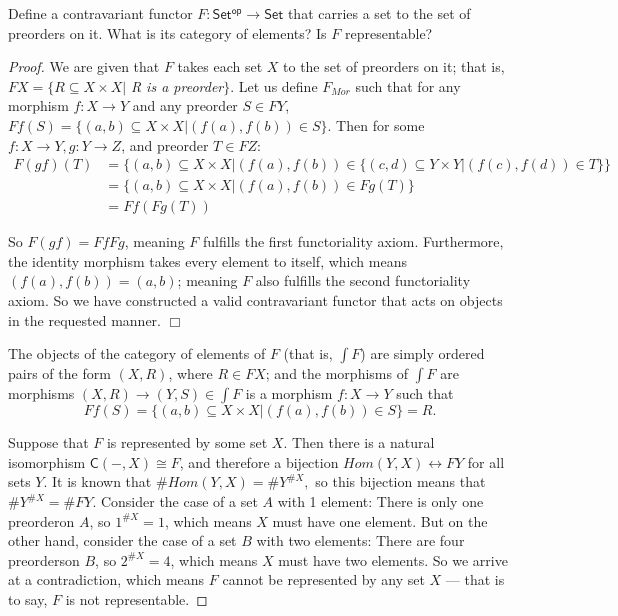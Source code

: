 \documentclass[main.tex]{subfiles}
\begin{document}
\begin{exercise}
	Define a contravariant functor $ F \colon \mathsf{Set^{op}} \to \mathsf{Set} $
	that carries a set to the set of preorders on it. What is its category of
	elements? Is $ F $ representable?	
\end{exercise}

\begin{proof} We are given that $ F $ takes each set $ X $ to the set of preorders on it; that is, $FX = \{R \subseteq X \times X | $ \textit{R is a preorder}$ \} $. Let us define $ F_{Mor} $ such that for any morphism $ f: X \to Y $ and any preorder $ S \in FY $, $ Ff(S) = \{(a,b) \subseteq X \times X | (f(a), f(b)) \in S\} $. Then for some $ f: X \to Y, g: Y \to Z $, and preorder $ T \in FZ $:	
\begin{align*}
F(gf)(T) &= \{(a,b) \subseteq X \times X | (f(a), f(b)) \in \{(c,d) \subseteq Y
\times Y | (f(c), f(d)) \in T\}\} \\
&= \{(a,b) \subseteq X \times X | (f(a), f(b)) \in Fg(T)\} \\
&= Ff(Fg(T))
\end{align*}

So $ F(gf) = FfFg $, meaning $ F $ fulfills the first functoriality axiom. Furthermore, the identity morphism takes every element to itself, which means $ (f(a), f(b)) = (a, b) $; meaning $ F $ also fulfills the second functoriality axiom. So we have constructed a valid contravariant functor that acts on objects in the requested manner. $ \Box $

The objects of the category of elements of $ F $ (that is, $ \int F $) are
simply ordered pairs of the form $ (X, R) $, where $ R \in FX $; and the
morphisms of $ \int F $ are morphisms $ (X, R) \to (Y, S) \in \int F $ is a
morphism $ f: X \to Y $ such that \[Ff(S) = \{(a,b) \subseteq X \times X |
(f(a), f(b)) \in S\} = R.\]

Suppose that $ F $ is represented by some set $ X $. Then there is a natural
isomorphism $ \mathsf{C}(-,X) \cong F $, and therefore a bijection $ Hom(Y, X)
\leftrightarrow FY $ for all sets $ Y $. It is known that $ \#Hom(Y, X) =
\#Y^{\#X}, $ so this bijection means that $ \#Y^{\#X} = \#FY $. Consider the
case of a set $ A $ with 1 element: There is only one preorder\footnotemark[1]
on $ A $, so $ 1^{\#X} = 1 $, which means $ X $ must have one element. But on
the other hand, consider the case of a set $ B $ with two elements: There are
four preorders\footnotemark[2] on $ B $, so $ 2^{\#X} = 4 $, which means $ X $
must have two elements. So we arrive at a contradiction, which means $ F $
cannot be represented by any set $ X $ --- that is to say, $ F $ is not
representable.
\end{proof}

\end{document}
